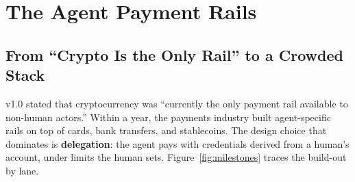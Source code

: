 \documentclass[11pt,letterpaper]{article}
\begin{document}
\section{The Agent Payment Rails}
\label{sec:rails}

\subsection{From ``Crypto Is the Only Rail'' to a Crowded Stack}

v1.0 stated that cryptocurrency was ``currently the only payment rail available to non-human actors.'' Within a year, the payments industry built agent-specific rails on top of cards, bank transfers, and stablecoins. The design choice that dominates is \textbf{delegation}: the agent pays with credentials derived from a human's account, under limits the human sets. Figure~\ref{fig:milestones} traces the build-out by lane.
\end{document}
